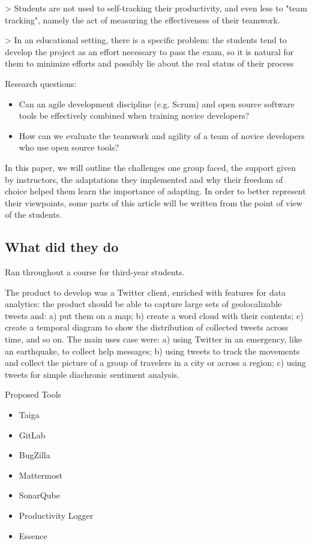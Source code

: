 > Students are not used to self-tracking their productivity, and even less to "team tracking", namely the act of measuring the effectiveness of their teamwork.

> In an educational setting, there is a specific problem: the students tend to develop the project as an effort necessary to pass the exam, so it is natural for them to minimize efforts and possibly lie about the real status of their process

Research questions:

\begin{itemize}
    \item Can an agile development discipline (e.g. Scrum) and open source software tools be effectively combined when training novice developers?
    \item How can we evaluate the teamwork and agility of a team of novice developers who use open source tools?
\end{itemize}


In this paper, we will outline the challenges one
group faced, the support given by instructors, the adaptations they implemented
and why their freedom of choice helped them learn the importance of adapting.
In order to better represent their viewpoints, some parts of this article will be
written from the point of view of the students.

\subsection{What did they do}

Ran throughout a course for third-year students.

The product to develop was a Twitter client, enriched with features for data
analytics: the product should be able to capture large sets of geolocalizable
tweets and: a) put them on a map; b) create a word cloud with their contents;
c) create a temporal diagram to show the distribution of collected tweets across
time, and so on. The main uses case were: a) using Twitter in an emergency, like
an earthquake, to collect help messages; b) using tweets to track the movements
and collect the picture of a group of travelers in a city or across a region; c)
using tweets for simple diachronic sentiment analysis.

Proposed Tools

\begin{itemize}
    \item Taiga
    \item GitLab
    \item BugZilla
    \item Mattermost
    \item SonarQube
    \item Productivity Logger
    \item Essence
\end{itemize}

